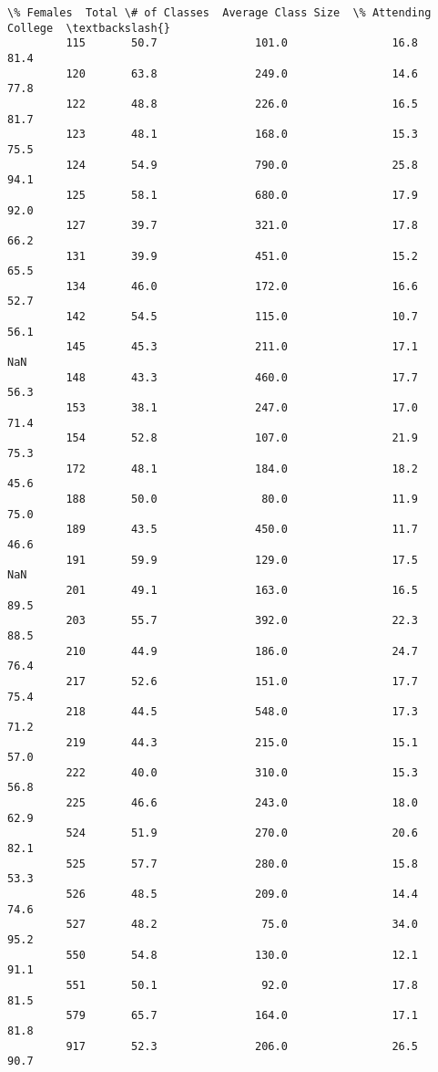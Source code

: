 \documentclass[11pt]{article}
\begin{document}
\begin{Verbatim}[commandchars=\\\{\}]
              \% Females  Total \# of Classes  Average Class Size  \% Attending College  \textbackslash{}
         115       50.7               101.0                16.8                 81.4   
         120       63.8               249.0                14.6                 77.8   
         122       48.8               226.0                16.5                 81.7   
         123       48.1               168.0                15.3                 75.5   
         124       54.9               790.0                25.8                 94.1   
         125       58.1               680.0                17.9                 92.0   
         127       39.7               321.0                17.8                 66.2   
         131       39.9               451.0                15.2                 65.5   
         134       46.0               172.0                16.6                 52.7   
         142       54.5               115.0                10.7                 56.1   
         145       45.3               211.0                17.1                  NaN   
         148       43.3               460.0                17.7                 56.3   
         153       38.1               247.0                17.0                 71.4   
         154       52.8               107.0                21.9                 75.3   
         172       48.1               184.0                18.2                 45.6   
         188       50.0                80.0                11.9                 75.0   
         189       43.5               450.0                11.7                 46.6   
         191       59.9               129.0                17.5                  NaN   
         201       49.1               163.0                16.5                 89.5   
         203       55.7               392.0                22.3                 88.5   
         210       44.9               186.0                24.7                 76.4   
         217       52.6               151.0                17.7                 75.4   
         218       44.5               548.0                17.3                 71.2   
         219       44.3               215.0                15.1                 57.0   
         222       40.0               310.0                15.3                 56.8   
         225       46.6               243.0                18.0                 62.9   
         524       51.9               270.0                20.6                 82.1   
         525       57.7               280.0                15.8                 53.3   
         526       48.5               209.0                14.4                 74.6   
         527       48.2                75.0                34.0                 95.2   
         550       54.8               130.0                12.1                 91.1   
         551       50.1                92.0                17.8                 81.5   
         579       65.7               164.0                17.1                 81.8   
         917       52.3               206.0                26.5                 90.7   
         

\end{Verbatim}
\end{document}
